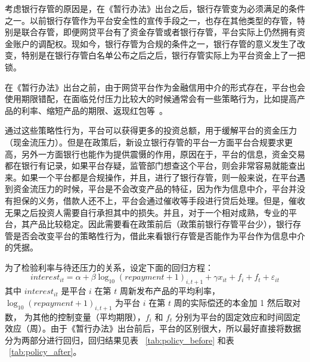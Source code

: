 \documentclass[lang=cn,11pt,authoryear]{elegantpaper}
\begin{document}
考虑银行存管的原因是，在《暂行办法》出台之后，银行存管变为必须满足的条件之一。以前银行存管作为平台安全性的宣传手段之一，也存在其他类型的存管，特别是联合存管，即便网贷平台有了资金存管或者银行存管，平台实际上仍然拥有资金账户的调配权。现如今，银行存管为合规的条件之一，银行存管的意义发生了改变，特别是在银行存管白名单公布之后之后，银行存管实际上为平台资金上了一把锁。

在《暂行办法》出台之前，由于网贷平台作为金融信用中介的形式存在，平台也会使用期限错配，在面临兑付压力比较大的时候通常会有一些策略行为，比如提高产品的利率、缩短产品的期限、返现红包等~\citep{ddscz2019}。

通过这些策略性行为，平台可以获得更多的投资总额，用于缓解平台的资金压力（现金流压力）。但是在政策后，新设立银行存管的平台一方面平台合规要求更高，另外一方面银行也能作为提供震慑的作用，原因在于，平台的信息，资金交易都在银行有记录，如果平台存疑，监管部门想查这个平台，则会非常容易就能查出来。如果一个平台都是合规操作，并且，进行了银行存管，则一般来说，在平台遇到资金流压力的时候，平台是不会改变产品的特征，因为作为信息中介，平台并没有担保的义务，借款人还不上，平台会通过催收等手段进行贷后处理。但是，催收无果之后投资人需要自行承担其中的损失。并且，对于一个相对成熟，专业的平台，其产品比较稳定。因此需要看在政策前后（政策前银行存管平台少），银行存管是否会改变平台的策略性行为，借此来看银行存管是否能作为平台作为信息中介的凭据。

为了检验利率与待还压力的关系，设定下面的回归方程：
\begin{equation}
interest_{it} = \alpha + \beta \log_{10}(repayment + 1)_{i,t+1} + \gamma x_{it} + f_{i} + f_{t} + \varepsilon_{it}
\end{equation}
其中 $interest_{it}$ 是平台 $i$ 在第 $t$ 周新发布产品的平均利率，$\log_{10}(repayment + 1)_{i,t+1}$ 为平台 $i$ 在第 $t$ 周的实际偿还的本金加 1 然后取对数， 为其他的控制变量（平均期限），$f_i$ 和 $f_t$ 分别为平台的固定效应和时间固定效应（周）。由于《暂行办法》出台前后，平台的区别很大，所以最好直接将数据分为两部分进行回归，回归结果见表 ~\ref{tab:policy_before} 和表 ~\ref{tab:policy_after}。 
\end{document}
